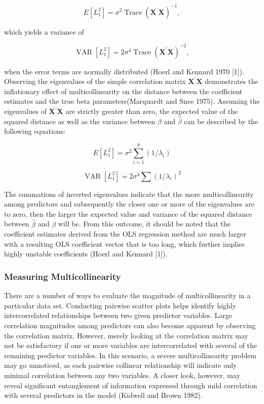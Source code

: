 $$
E\left[L_{1}^{2}\right]=\sigma^{2} \operatorname{Trace}\left(\mathbf{X}^{\prime} \mathbf{X}\right)^{-1},
$$

\noindent which yields a variance of 

$$
	\operatorname{VAR}\left[L_{1}^{2}\right]=2 \sigma^{4} \operatorname{Trace}\left(\mathbf{X}^{\prime} \mathbf{X}\right)^{-2},
$$

\noindent when the error terms are normally distributed (Hoerl and Kennard 1970 [1]). Observing the eigenvalues of the simple correlation matrix $\mathbf X^{\prime} \mathbf X$ demonstrates the inflationary effect of multicollinearity on the distance between the coefficient estimates and the true beta parameters(Marquardt and Snee 1975). Assuming the eigenvalues of $\mathbf X^{\prime} \mathbf X$ are strictly greater than zero, the expected value of the squared distance as well as the variance between $\beta$ and $\hat{\beta}$ can be described by the following equations: 

$$
E\left[L_{1}^{2}\right]=\sigma^{2} \sum_{i=1}^{p}\left(1 / \lambda_{i}\right)
$$

$$
\operatorname{VAR}\left[L_{1}^{2}\right]=2 \sigma^{4} \sum\left(1 / \lambda_{i}\right)^{2}
$$	 

\noindent The summations of inverted eigenvalues indicate that the more multicollinearity among predictors and subsequently the closer one or more of the eigenvalues are to zero, then the larger the expected value and variance of the squared distance between $\hat{\beta}$ and $\beta$ will be. From this outcome, it should be noted that the coefficient estimates derived from the OLS regression method are much larger with a resulting OLS coefficient vector that is too long, which further implies highly unstable coefficients (Hoerl and Kennard [1]).

\subsubsection{Measuring Multicollinearity}

\noindent There are a number of ways to evaluate the magnitude of multicollinearity in a particular data set. Conducting pairwise scatter plots helps identify highly intercorrelated relationships between two given predictor variables. Large correlation magnitudes among predictors can also become apparent by observing the correlation matrix. However, merely looking at the correlation matrix may not be satisfactory if one or more variables are intercorrelated with several of the remaining predictor variables. In this scenario, a severe multicollinearity problem may go unnoticed, as each pairwise collinear relationship will indicate only minimal correlation between any two variables. A closer look, however, may reveal significant entanglement of information expressed through mild correlation with several predictors in the model (Kidwell and Brown 1982).\\

